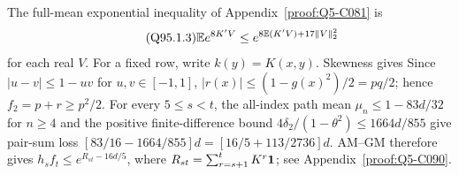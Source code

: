 The full-mean exponential inequality of Appendix~\ref{proof:Q5-C081} is
\begin{equation}\tag{Q95.1.3}\label{eq:Q95:1.3}
\mathbb E e^{8K'V}\le e^{8\mathbb E(K'V)+17\|V\|_2^2}
\end{equation}
for each real \(V\).
For a fixed row, write \(k(y)=\allowbreak K(x,\allowbreak y)\). Skewness gives
Since \(|u-v|\le\allowbreak 1-uv\) for \(u,\allowbreak v\in[-1,\allowbreak 1]\),
\(|r(x)|\le\allowbreak (1-g(x)^2)/2=\allowbreak pq/2\); hence \(f_2=\allowbreak p+r\ge\allowbreak  p^2/2\).
For every \(5\le\allowbreak  s<\allowbreak t\), the all-index path mean
\(\mu_n\le\allowbreak 1-83d/32\) for \(n\ge\allowbreak 4\) and the positive finite-difference
bound \(4\delta_2/(1-\theta^2)\le\allowbreak 1664d/855\) give pair-sum loss
\([83/16-1664/855]d=\allowbreak [16/5+113/2736]d\).
AM--GM therefore gives \(h_sf_t\le\allowbreak  e^{R_{st}-16d/5}\), where
\(R_{st}=\allowbreak \sum_{r=\allowbreak s+1}^tK^r\mathbf1\); see Appendix~\ref{proof:Q5-C090}.

